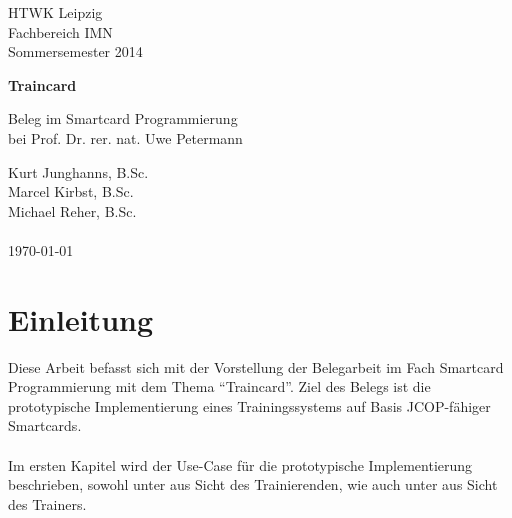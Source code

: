 \documentclass[a4paper,12pt]{scrartcl}
\begin{document}
 
\begin{titlepage}
\begin{small}
\vfill {HTWK Leipzig\\
Fachbereich IMN \\
Sommersemester 2014}
\end{small}
 
\begin{center}
\begin{Large}
\vfill {\textsf{\textbf{
Traincard\\
}}}
\end{Large}
Beleg im Smartcard Programmierung\\bei Prof. Dr. rer. nat. Uwe Petermann
\end{center}
 
\begin{small}

\vfill
Kurt Junghanns, B.Sc.\\
Marcel Kirbst, B.Sc. \\
Michael Reher, B.Sc.\\
\\
\today
\end{small}
 
\end{titlepage}
 
\tableofcontents
\clearpage
\listoffigures
\listoftables
\thispagestyle{empty}
 
\clearpage
\onehalfspacing
 
\pagestyle{plain}
 
\section{Einleitung}
\label{sec:0}
Diese Arbeit befasst sich mit der Vorstellung der Belegarbeit im Fach Smartcard Programmierung mit dem Thema ``Traincard''. 
Ziel des Belegs ist die prototypische Implementierung eines Trainingssystems auf Basis JCOP-fähiger Smartcards. 
\\
\\
Im ersten Kapitel  wird der Use-Case für die prototypische Implementierung beschrieben, sowohl unter  aus Sicht des Trainierenden, wie auch unter  aus Sicht des Trainers.
\end{document}
